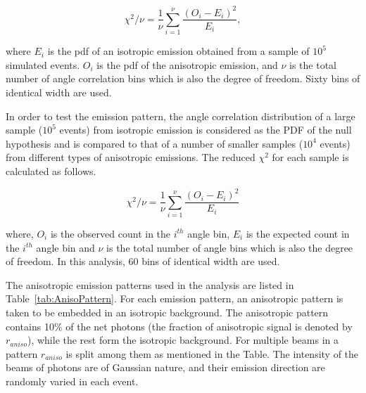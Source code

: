 \begin{equation}
\chi^2/\nu = \frac{1}{\nu} \sum^{\nu}_{i=1} \frac{(O_i - E_i)^2}{E_i},
\label{redchi2}
\end{equation}

where $E_i$ is the pdf of an isotropic emission obtained from a sample of $10^5$ simulated events. 
$O_i$ is the pdf of the anisotropic emission, and $\nu$ is the total number of angle correlation bins 
which is also the degree of freedom. Sixty bins of identical width are used.



In order to test the emission pattern, the angle correlation distribution of a large sample ($10^5$ events) 
from isotropic emission is considered as the PDF of the null hypothesis and is compared 
to that of a number of smaller samples ($10^4$ events) from different types of anisotropic emissions. 
The reduced $\chi^2$ for each sample is calculated as follows.

\begin{equation}
\chi^2/\nu = \frac{1}{\nu} \sum^{\nu}_{i=1} \frac{(O_i - E_i)^2}{E_i}
\label{redchi2}
\end{equation}

where, $O_i$ is the observed count in the $i^{th}$ angle bin, $E_i$ is the expected count in the $i^{th}$ 
angle bin and $\nu$ is the total number of angle bins which is also the degree of freedom. In this analysis, 
60 bins of identical width are used. 


The anisotropic emission patterns used in the analysis are listed 
in Table~\ref{tab:AnisoPattern}. For each emission pattern,  an anisotropic pattern is taken to be embedded 
in an isotropic background. The anisotropic pattern contains  
10\% of the net photons (the fraction of anisotropic signal is denoted by $r_{aniso}$),
while the rest form the isotropic background. For 
multiple beams in a pattern $r_{aniso}$ is split among them 
as mentioned in the Table. The intensity of the beams of photons are of 
Gaussian nature, and their emission direction are 
randomly varied in each event.

